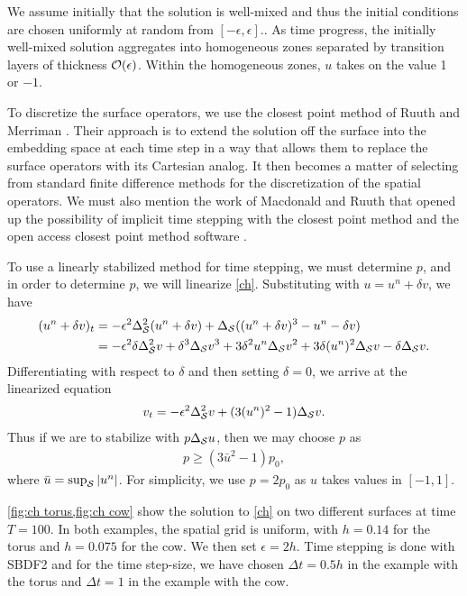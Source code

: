 We assume initially that the solution is well-mixed and thus the initial conditions are chosen uniformly at random from $[-\epsilon,\epsilon]$.. As time progress, the initially well-mixed solution aggregates into homogeneous zones separated by transition layers of thickness $\O(\epsilon)$. Within the homogeneous zones, $u$ takes on the value 1 or $-1$. 

To discretize the surface operators, we use the closest point method of Ruuth and Merriman \cite{ruuth2008simple}. Their approach is to extend the solution off the surface into the embedding space at each time step in a way that allows them to replace the surface operators with its Cartesian analog. It then becomes a matter of selecting from standard finite difference methods for the discretization of the spatial operators. We must also mention the work of Macdonald and Ruuth \cite{macdonald2009implicit} that opened up the possibility of implicit time stepping with the closest point method and the open access closest point method software \cite{cpmcodes}.

To use a linearly stabilized method for time stepping, we must determine $p$, and in order to determine $p$, we will linearize \cref{ch}. Substituting with $u = u^n + \delta v$, we have 
\begin{align}
\begin{split} 
(u^n + \delta v)_t 
&= -\epsilon^2\Delta_\S^2 (u^n + \delta v) 
+ \Delta_\S((u^n + \delta v)^3 - u^n - \delta v) 
\\
&= -\epsilon^2\delta\Delta_\S^2 v
+ \delta^3\Delta_\S v^3 + 3\delta^2u^n \Delta_\S v^2 + 3\delta (u^n)^2 \Delta_\S v - \delta \Delta_\S v. 
\end{split} 
\label{ch linearize}
\end{align}
Differentiating with respect to $\delta$ and then setting $\delta = 0$, we arrive at the linearized equation 
\begin{align}
v_t = -\epsilon^2\Delta_\S^2 v + (3(u^n)^2-1) \Delta_\S v. 
\end{align}
Thus if we are to stabilize with $p\Delta_\S u$, then we may choose $p$ as 
\begin{align}
p \geq (3\bar u^2 - 1)p_0, 
\end{align}
where $\bar u = \sup_\S \abs{u^n}$. For simplicity, we use $p=2p_0$ as $u$ takes values in $[-1,1]$.  

\cref{fig:ch torus,fig:ch cow} show the solution to \cref{ch} on two different surfaces at time $T=100$. In both examples, the spatial grid is uniform, with $h=0.14$ for the torus and $h=0.075$ for the cow. We then set $\epsilon=2h$. Time stepping is done with SBDF2 and for the time step-size, we have chosen $\Delta t = 0.5h$ in the example with the torus and $\Delta t = 1$ in the example with the cow. 

